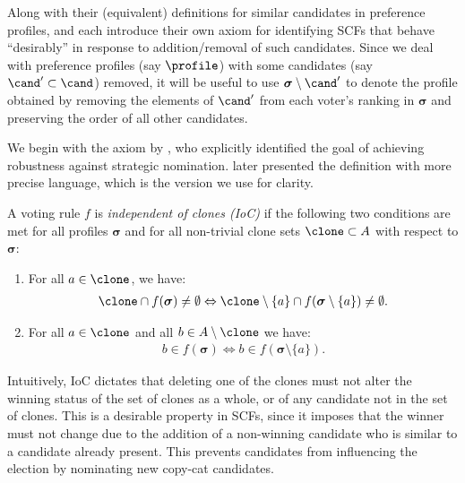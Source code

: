 Along with their (equivalent) definitions for similar candidates in preference profiles, \citet{Tideman87:Independence} and \citet{Laffond96:Composition} each introduce their own axiom for identifying SCFs that behave ``desirably'' in response to addition/removal of such candidates. Since we deal with preference profiles (say $\profile$) with some candidates (say $\cand'\subset \cand$) removed, it will be useful to use $\boldsymbol{\sigma} \setminus \cand'$ to denote the profile obtained by removing the elements of $\cand'$ from each voter's ranking in $\boldsymbol{\sigma}$ and preserving the order of all other candidates.

We begin with the axiom by \citet{Tideman87:Independence}, who explicitly identified the goal of achieving robustness against strategic nomination. \citet{Zavist89:Complete} later presented the definition with more precise language, which is the version we use for clarity.

\begin{definition}\label{appdef:ioc}
A voting rule $f$ is \emph{independent of clones (IoC)} if the following two conditions are met for all profiles $\boldsymbol{\sigma}$ and for all non-trivial clone sets $\clone \subset A$ with respect to $\boldsymbol{\sigma}$:
\begin{enumerate}
    \item For all $a \in \clone$, we have:
    \begin{align*}
        \clone \cap f(\boldsymbol{\sigma}) \neq \emptyset \Leftrightarrow \clone \setminus \{a\} \cap f(\boldsymbol{\sigma} \setminus \{a\}) \neq \emptyset.  
    \end{align*}
    \item For all $a \in \clone$ and all $b \in A \setminus \clone$ we have:
    \begin{align*}
       b \in f(\boldsymbol{\sigma}) \Leftrightarrow b \in f(\boldsymbol{\sigma} \setminus \{a\}).
    \end{align*}
\end{enumerate}
\end{definition}

Intuitively, IoC dictates that deleting one of the clones must not alter the winning status of the set of clones as a whole, or of any candidate not in the set of clones. This is a desirable property in SCFs, since it imposes that the winner must not change due to the addition of a non-winning candidate who is similar to a candidate already present. This prevents candidates from influencing the election by nominating new copy-cat candidates. 

